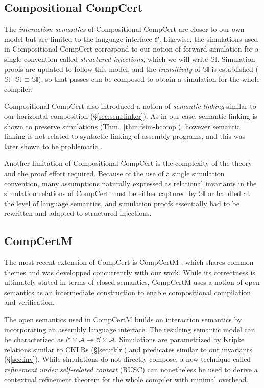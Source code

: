 \documentclass[draft,11pt]{report}
\begin{document}

\subsection{Compositional CompCert} %

The \emph{interaction semantics} of
Compositional CompCert \citep{compcompcert}
are closer to our own model
but are limited to the language interface $\mathcal{C}$.
Likewise, the simulations used in Compositional CompCert
correspond to our notion of forward simulation
for a single convention called \emph{structured injections},
which we will write $\mathbb{SI}$.
Simulation proofs are updated to follow this model,
and the \emph{transitivity} of $\mathbb{SI}$ is established
($\mathbb{SI} \cdot \mathbb{SI} \equiv \mathbb{SI}$),
so that passes can be composed
to obtain a simulation for the whole compiler.

Compositional CompCert also introduced a notion of \emph{semantic linking}
similar to our horizontal composition
(\S\ref{sec:sem:linker}).
As in our case,
semantic linking is shown to preserve simulations
(Thm.~\ref{thm:fsim-hcomp}),
however semantic linking is not related to
syntactic linking of assembly programs,
and this was later shown to be problematic \citep{compcertm}.

Another limitation of Compositional CompCert
is the complexity of the theory
and the proof effort required.
Because of the use of a single simulation convention,
many assumptions naturally expressed as
relational invariants in the simulation relations of CompCert
must be either captured by $\mathbb{SI}$
or handled at the level of language semantics,
and simulation proofs
essentially had to be rewritten and adapted to
structured injections.


\subsection{CompCertM} %

The most recent extension of CompCert is CompCertM \citep{compcertm},
which shares common themes and was developped concurrently
with our work.
While its correctness
is ultimately stated in terms of closed semantics,
CompCertM uses a notion of open semantics
as an intermediate construction
to enable compositional compilation and verification.

The open semantics used in CompCertM
builds on interaction semantics
by incorporating an assembly language interface.
The resulting semantic model can be characterized as
$\mathcal{C} \times \mathcal{A} \twoheadrightarrow
 \mathcal{C} \times \mathcal{A}$.
Simulations
are parametrized by Kripke relations similar to CKLRs (\S\ref{sec:cklr})
and predicates similar to our invariants (\S\ref{sec:inv}).
While simulations do not directly compose,
a new technique called \emph{refinement under self-related context}
(RUSC)
can nonetheless be used to derive a contextual refinement theorem
for the whole compiler with minimal overhead.
\end{document}
